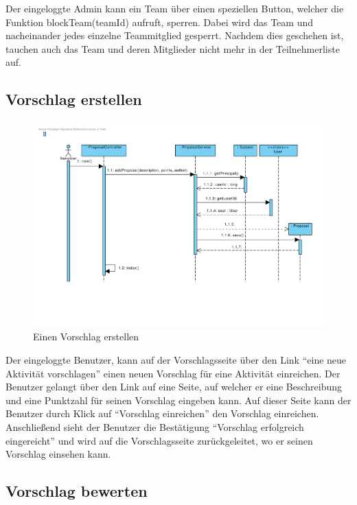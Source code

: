 Der eingeloggte Admin kann ein Team über einen speziellen Button, welcher die Funktion blockTeam(teamId) aufruft, sperren. Dabei wird das Team und nacheinander jedes einzelne Teammitglied gesperrt. Nachdem dies geschehen ist, tauchen auch das Team und deren Mitglieder nicht mehr in der Teilnehmerliste auf.\\

\subsection{Vorschlag erstellen}

\begin{figure}[H]
  \centering
  \includegraphics[width=\textwidth, clip]{gfx/vorschlag_erstellen}
  \caption{Einen Vorschlag erstellen}
\end{figure}

Der eingeloggte Benutzer, kann auf der Vorschlagsseite über den Link
``eine neue Aktivität vorschlagen'' einen neuen Vorschlag für eine
Aktivität einreichen. Der Benutzer gelangt über den Link auf eine
Seite, auf welcher er eine Beschreibung und eine Punktzahl für seinen Vorschlag
 eingeben kann. Auf dieser Seite kann der Benutzer durch Klick auf
 ``Vorschlag einreichen'' den Vorschlag einreichen. Anschließend sieht
 der Benutzer die Bestätigung ``Vorschlag erfolgreich eingereicht''
 und wird auf die Vorschlagsseite zurückgeleitet, wo er seinen
 Vorschlag einsehen kann.
 
\subsection{Vorschlag bewerten}

